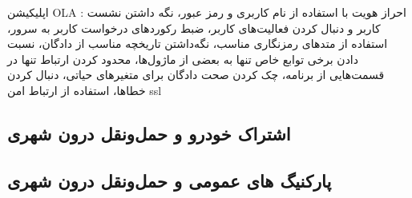 اپلیکیشن OLA : احراز هویت با استفاده از نام کاربری و رمز عبور، نگه داشتن نشست کاربر و دنبال کردن فعالیت‌های کاربر، ضبط رکوردهای درخواست کاربر به سرور، استفاده از متد‌های رمزنگاری مناسب، نگه‌داشتن تاریخچه مناسب از دادگان، نسبت دادن برخی توابع خاص تنها به بعضی از ماژول‌ها، محدود کردن ارتباط تنها در قسمت‌هایی از برنامه،‌ چک کردن صحت دادگان برای متغیرهای حیاتی، دنبال کردن خطاها، استفاده از ارتباط امن ssl

\subsection{اشتراک خودرو و حمل‌و‌نقل درون شهری}


\subsection{پارکنیگ های عمومی و حمل‌و‌نقل درون شهری}


